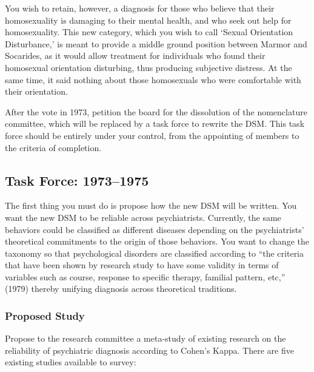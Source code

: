 You wish to retain, however, a diagnosis for those who believe that their homosexuality is damaging to their mental health, and who seek out help for homosexuality. This new category, which you wish to call `Sexual Orientation Disturbance,' is meant to provide a middle ground position between Marmor and Socarides, as it would allow treatment for individuals who found their homosexual orientation disturbing, thus producing subjective distress. At the same time, it said nothing about those homosexuals who were comfortable with their orientation.

After the vote in 1973, petition the board for the dissolution of the nomenclature committee, which will be replaced by a task force to rewrite the DSM. This task force should be entirely under your control, from the appointing of members to the criteria of completion.

\subsection{Task Force: 1973--1975}
\label{taskforce:1973-1975}

The first thing you must do is propose how the new DSM will be written. You want the new DSM to be reliable across psychiatrists. Currently, the same behaviors could be classified as different diseases depending on the psychiatrists' theoretical commitments to the origin of those behaviors. You want to change the taxonomy so that psychological disorders are classified according to ``the criteria that have been shown by research study to have some validity in terms of variables such as course, response to specific therapy, familial pattern, etc,'' (1979) thereby unifying diagnosis across theoretical traditions.

\subsubsection{Proposed Study}
\label{proposedstudy}

Propose to the research committee a meta-study of existing research on the reliability of psychiatric diagnosis according to Cohen's Kappa. There are five existing studies available to survey:

